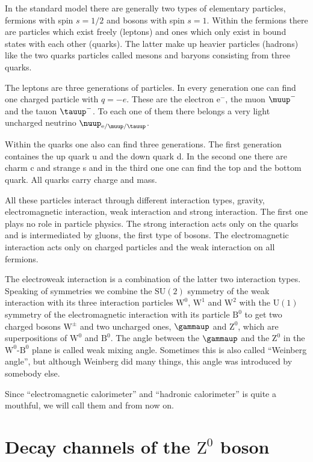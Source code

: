 \documentclass[11pt, english, fleqn, DIV=15, headinclude, BCOR=2cm]{scrreprt}
\begin{document}
In the standard model there are generally two types of elementary particles,
fermions with spin $s = 1/2$ and bosons with spin $s = 1$. Within the fermions
there are particles which exist freely (leptons) and ones which only exist in
bound states with each other (quarks). The latter make up heavier particles
(hadrons) like the two quarks particles called mesons and baryons consisting
from three quarks. 

The leptons are three generations of particles. In every
generation one can find one charged particle with $q = -e$. These are the
electron $\mathrm e^-$, the muon $\muup^-$ and the tauon $\tauup^-$. To each
one of them there belongs a very light uncharged neutrino
$\nuup_{\mathrm{e}/\muup/\tauup}$.

Within the quarks one also can find three generations. The first generation
containes the up quark u and the down quark d. In the second one there are
charm c and strange s and in the third one one can find the top and the bottom
quark. All quarks carry charge and mass.

All these particles interact through different interaction types, gravity,
electromagnetic interaction, weak interaction and strong interaction. The first
one plays no role in particle physics. The strong interaction acts only on the
quarks and is intermediated by gluons, the first type of bosons. The
electromagnetic interaction acts only on charged particles and the weak
interaction on all fermions. 

The electroweak interaction is a combination of the latter two interaction
types. Speaking of symmetries we combine the $\mathrm{SU}(2)$ symmetry of the
weak interaction with its three interaction particles $\mathrm W^0$, $\mathrm
W^1$ and $\mathrm W^2$ with the $\mathrm U(1)$ symmetry of the electromagnetic
interaction with its particle $\mathrm B^0$ to get two charged bosons $\mathrm
W^\pm$ and two uncharged ones, $\gammaup$ and $\mathrm Z^0$, which are
superpositions of $\mathrm W^0$ and $\mathrm B^0$. The angle between the
$\gammaup$ and the $\mathrm Z^0$ in the $\mathrm W^0$-$\mathrm B^0$ plane is
called weak mixing angle. Sometimes this is also called \enquote{Weinberg
angle}, but although Weinberg did many things, this angle was introduced by
somebody else.

Since \enquote{electromagnetic calorimeter} and \enquote{hadronic calorimeter}
is quite a mouthful, we will call them \ecal{} and \hcal{} from now on.

\section{Decay channels of the $\mathrm Z^0$ boson}
\end{document}
